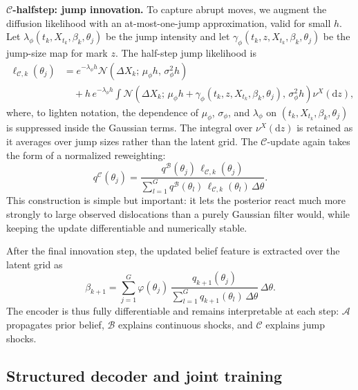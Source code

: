 \documentclass{article}
\begin{document}
\textbf{$\mathcal{C}$-halfstep: jump innovation.}
To capture abrupt moves, we augment the diffusion likelihood with an at-most-one-jump approximation, valid for small $h$. Let $\lambda_{\phi}(t_k,X_{t_k},\beta_k,\theta_j)$ be the jump intensity and let $\gamma_{\phi}(t_k,z,X_{t_k},\beta_k,\theta_j)$ be the jump-size map for mark $z$. The half-step jump likelihood is
\begin{align}
\ell_{\mathcal{C},k}(\theta_j)
&=
e^{-\lambda_{\phi}h}
\mathcal{N}\!\left(
\Delta X_k;\,
\mu_{\phi}h,\,
\sigma_{\phi}^2 h
\right)
\nonumber\\
&\quad
+
h\,e^{-\lambda_{\phi}h}
\int
\mathcal{N}\!\left(
\Delta X_k;\,
\mu_{\phi}h+\gamma_{\phi}(t_k,z,X_{t_k},\beta_k,\theta_j),\,
\sigma_{\phi}^2 h
\right)\nu^X(\mathrm{d} z),
\label{eq:c-likelihood}
\end{align}
where, to lighten notation, the dependence of $\mu_{\phi}$, $\sigma_{\phi}$, and $\lambda_{\phi}$ on $(t_k,X_{t_k},\beta_k,\theta_j)$ is suppressed inside the Gaussian terms. The integral over  $\nu^X(\mathrm{d}z)$ is retained as it averages over jump sizes rather than the latent grid. The $\mathcal{C}$-update again takes the form of a normalized reweighting:
\begin{equation*}
q^{\mathcal{C}}(\theta_j)
=
\frac{q^\mathcal{B}(\theta_j)\,\ell_{\mathcal{C},k}(\theta_j)}
{\sum_{l=1}^{G} q^\mathcal{B}(\theta_l)\,\ell_{\mathcal{C},k}(\theta_l)\,\Delta\theta}.
\end{equation*}
This construction is simple but important: it lets the posterior react much more strongly to large observed dislocations than a purely Gaussian filter would, while keeping the update differentiable and numerically stable.

After the final innovation step, the updated belief feature is extracted over the latent grid as
\begin{equation*}
\beta_{k+1}
=
\sum_{j=1}^{G}
\varphi(\theta_j)\,
\frac{q_{k+1}(\theta_j)}{\sum_{l=1}^{G} q_{k+1}(\theta_l)\,\Delta\theta}\,
\Delta\theta.
\end{equation*}
The encoder is thus fully differentiable and remains interpretable at each step: $\mathcal{A}$ propagates prior belief, $\mathcal{B}$ explains continuous shocks, and $\mathcal{C}$ explains jump shocks.

\subsection{Structured decoder and joint training}
\label{sec:decoder}
\end{document}

